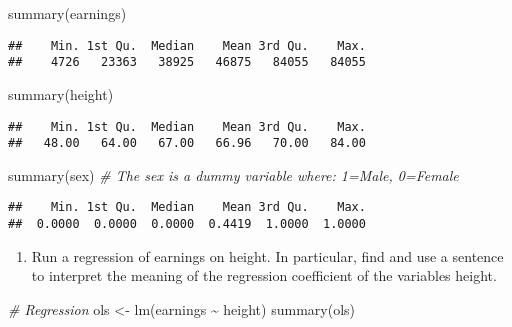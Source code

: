 \documentclass[
]{article}
\newenvironment{Shaded}{\begin{snugshade}}{\end{snugshade}}
\newcommand{\CommentTok}[1]{\textcolor[rgb]{0.56,0.35,0.01}{\textit{#1}}}
\newcommand{\FunctionTok}[1]{\textcolor[rgb]{0.00,0.00,0.00}{#1}}
\newcommand{\NormalTok}[1]{#1}
\newcommand{\OtherTok}[1]{\textcolor[rgb]{0.56,0.35,0.01}{#1}}
\newcommand{\SpecialCharTok}[1]{\textcolor[rgb]{0.00,0.00,0.00}{#1}}
\providecommand{\tightlist}{%
  \setlength{\itemsep}{0pt}\setlength{\parskip}{0pt}}
\begin{document}
\begin{Shaded}
\begin{Highlighting}[]
\FunctionTok{summary}\NormalTok{(earnings) }
\end{Highlighting}
\end{Shaded}

\begin{verbatim}
##    Min. 1st Qu.  Median    Mean 3rd Qu.    Max. 
##    4726   23363   38925   46875   84055   84055
\end{verbatim}

\begin{Shaded}
\begin{Highlighting}[]
\FunctionTok{summary}\NormalTok{(height)       }
\end{Highlighting}
\end{Shaded}

\begin{verbatim}
##    Min. 1st Qu.  Median    Mean 3rd Qu.    Max. 
##   48.00   64.00   67.00   66.96   70.00   84.00
\end{verbatim}

\begin{Shaded}
\begin{Highlighting}[]
\FunctionTok{summary}\NormalTok{(sex)      }\CommentTok{\# The sex is a dummy variable where: 1=Male, 0=Female}
\end{Highlighting}
\end{Shaded}

\begin{verbatim}
##    Min. 1st Qu.  Median    Mean 3rd Qu.    Max. 
##  0.0000  0.0000  0.0000  0.4419  1.0000  1.0000
\end{verbatim}

\begin{enumerate}
\def\labelenumi{\alph{enumi})}
\setcounter{enumi}{2}
\tightlist
\item
  Run a regression of earnings on height. In particular, find and use a
  sentence to interpret the meaning of the regression coefficient of the
  variables height.
\end{enumerate}

\begin{Shaded}
\begin{Highlighting}[]
\CommentTok{\# Regression}
\NormalTok{ols }\OtherTok{\textless{}{-}} \FunctionTok{lm}\NormalTok{(earnings }\SpecialCharTok{\textasciitilde{}}\NormalTok{ height)}
\FunctionTok{summary}\NormalTok{(ols)}
\end{Highlighting}
\end{Shaded}
\end{document}
